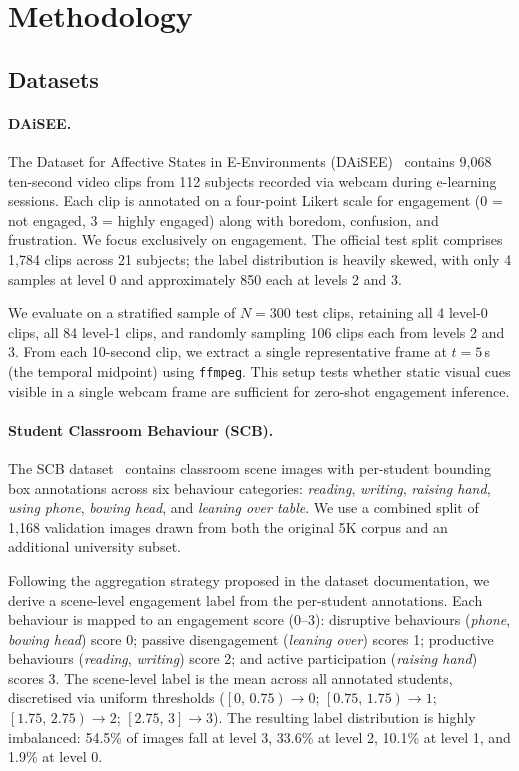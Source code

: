\section{Methodology}
\label{sec:method}

\subsection{Datasets}

\paragraph{DAiSEE.}
The Dataset for Affective States in E-Environments
(DAiSEE)~\cite{gupta2016daisee} contains 9{,}068 ten-second video clips
from 112 subjects recorded via webcam during e-learning sessions.  Each
clip is annotated on a four-point Likert scale for engagement (0 = not
engaged, 3 = highly engaged) along with boredom, confusion, and
frustration.  We focus exclusively on engagement.  The official test
split comprises 1{,}784 clips across 21 subjects; the label distribution
is heavily skewed, with only 4 samples at level 0 and approximately 850
each at levels 2 and 3.

We evaluate on a stratified sample of $N\!=\!300$ test clips, retaining
all 4 level-0 clips, all 84 level-1 clips, and randomly sampling 106
clips each from levels 2 and 3.  From each 10-second clip, we extract
a single representative frame at $t\!=\!5$\,s (the temporal midpoint)
using \texttt{ffmpeg}.  This setup tests whether static visual cues
visible in a single webcam frame are sufficient for zero-shot engagement
inference.

\paragraph{Student Classroom Behaviour (SCB).}
The SCB dataset~\cite{wang2023scb} contains classroom scene images with
per-student bounding box annotations across six behaviour categories:
\emph{reading}, \emph{writing}, \emph{raising hand}, \emph{using phone},
\emph{bowing head}, and \emph{leaning over table}.  We use a combined
split of 1{,}168 validation images drawn from both the original 5K
corpus and an additional university subset.

Following the aggregation strategy proposed in the dataset documentation,
we derive a scene-level engagement label from the per-student annotations.
Each behaviour is mapped to an engagement score (0--3): disruptive
behaviours (\emph{phone}, \emph{bowing head}) score 0; passive
disengagement (\emph{leaning over}) scores 1; productive behaviours
(\emph{reading}, \emph{writing}) score 2; and active participation
(\emph{raising hand}) scores 3.  The scene-level label is the
mean across all annotated students, discretised via uniform thresholds
($\left[0,\,0.75\right) \to 0$; $\left[0.75,\,1.75\right) \to 1$;
$\left[1.75,\,2.75\right) \to 2$; $\left[2.75,\,3\right] \to 3$).
The resulting label distribution is highly imbalanced: 54.5\% of images
fall at level 3, 33.6\% at level 2, 10.1\% at level 1, and 1.9\%
at level 0.


